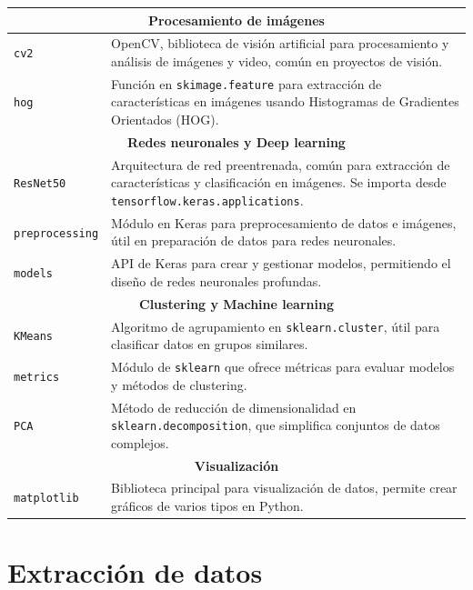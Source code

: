 \begin{longtable}{p{4cm} p{11cm}}
    \multicolumn{2}{c}{\textbf{Procesamiento de imágenes}} \\
    \hline
    \texttt{cv2} & OpenCV, biblioteca de visión artificial para procesamiento y análisis de imágenes y video, común en proyectos de visión. \\
    \texttt{hog} & Función en \texttt{skimage.feature} para extracción de características en imágenes usando Histogramas de Gradientes Orientados (HOG). \\
    \hline
    
    \multicolumn{2}{c}{\textbf{Redes neuronales y Deep learning}} \\
    \hline
    \texttt{ResNet50} & Arquitectura de red preentrenada, común para extracción de características y clasificación en imágenes. Se importa desde \texttt{tensorflow.keras.applications}. \\
    \texttt{preprocessing} & Módulo en Keras para preprocesamiento de datos e imágenes, útil en preparación de datos para redes neuronales. \\
    \texttt{models} & API de Keras para crear y gestionar modelos, permitiendo el diseño de redes neuronales profundas. \\
    \hline
    
    \multicolumn{2}{c}{\textbf{Clustering y Machine learning}} \\
    \hline
    \texttt{KMeans} & Algoritmo de agrupamiento en \texttt{sklearn.cluster}, útil para clasificar datos en grupos similares. \\
    \texttt{metrics} & Módulo de \texttt{sklearn} que ofrece métricas para evaluar modelos y métodos de clustering. \\
    \texttt{PCA} & Método de reducción de dimensionalidad en \texttt{sklearn.decomposition}, que simplifica conjuntos de datos complejos. \\
    \hline
    
    \multicolumn{2}{c}{\textbf{Visualización}} \\
    \hline
    \texttt{matplotlib} & Biblioteca principal para visualización de datos, permite crear gráficos de varios tipos en Python. \\
    \hline
    
\end{longtable}



\section{Extracción de datos}

